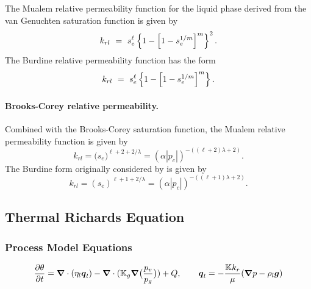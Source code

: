 The Mualem relative permeability function for the liquid phase derived
from the van Genuchten saturation function is given by
\begin{equation}
  k_{rl} \ =\  s_e^{\ell} \left\{ 1 - \left[ 1 - s_e^{1/m} \right]^m \right\}^2.
  \label{eq:krl_vGM} 
\end{equation}
The Burdine relative permeability function has the form
\begin{equation}
  k_{rl} \ =\  s_e^{\ell} \left\{ 1 - \left[ 1 - s_e^{1/m} \right]^m \right\}.
  \label{eq:krl_vGB} 
\end{equation}


\paragraph{Brooks-Corey relative permeability.}
Combined with the Brooks-Corey saturation function, the Mualem
relative permeability function is given by
\begin{equation} \label{eq:krl_BCM}
  k_{rl} = \big(s_e\big)^{\ell+2+2/\lambda} 
         = \left(\alpha |p_c|\right)^{-((\ell+2)\lambda+2)}.
\end{equation}
The Burdine form originally considered by \citet{brooks1964hydraulic}
is given by
\begin{equation} \label{eq:krl_BCB}
  k_{rl} = \left( s_e \right)^{ \ell+1+2/\lambda}
         = \left( \alpha |p_c| \right)^{-((\ell+1)\lambda+2)}.
\end{equation}



\subsection{Thermal Richards Equation}
\label{sec:thermal-richards-equation}

\subsubsection{Process Model Equations} 
\label{sec:thermal-richards-model-equations}

\begin{equation}
  \frac{\partial \theta}{\partial t} 
  =
  {\boldsymbol{\nabla}} \cdot (\eta_l {\boldsymbol{q}}_l)
  - {\boldsymbol{\nabla}} \cdot ({\mathbb K}_g {\boldsymbol{\nabla}} \big(\frac{p_v}{p_g}\big)) + Q,
  \qquad
  {\boldsymbol{q}}_l = -\frac{{\mathbb K} k_r}{\mu} ({\boldsymbol{\nabla}} p - \rho_l {\boldsymbol{g}})
\end{equation}


